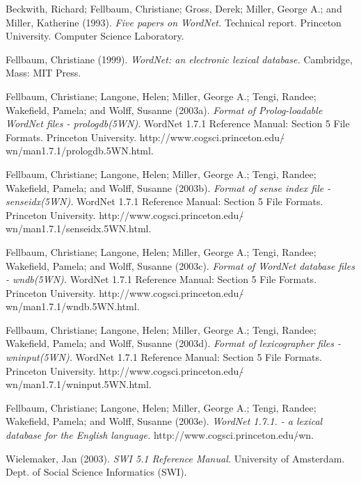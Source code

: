 \documentclass[12pt]{article}
\begin{document}
\newpage

\begin{thebibliography}{}
\raggedright
\frenchspacing

\item[Beckwith, Richard; Fellbaum, Christiane; Gross, Derek; Miller, George A.;
and Miller, Katherine]
(1993).
\emph{Five papers on WordNet.}
Technical report. Princeton University. Computer Science Laboratory.

\item[Fellbaum, Christiane (1999).]
\emph{WordNet: an electronic lexical database.}
Cambridge, Mass: MIT Press.

\item[Fellbaum, Christiane; Langone, Helen; Miller, George A.; Tengi, Randee; Wakefield, Pamela;]
and Wolff, Susanne (2003a).
\emph{Format of Prolog-loadable WordNet files - prologdb(5WN).}
WordNet 1.7.1 Reference Manual: Section 5 File Formats. Princeton University.
http://www.cogsci.princeton.edu/\( \tilde{} \)wn/man1.7.1/prologdb.5WN.html.

\item[Fellbaum, Christiane; Langone, Helen; Miller, George A.; Tengi, Randee; Wakefield, Pamela;]
and Wolff, Susanne (2003b).
\emph{Format of sense index file - senseidx(5WN).}
WordNet 1.7.1 Reference Manual: Section 5 File Formats. Princeton University.
http://www.cogsci.princeton.edu/\( \tilde{} \)wn/man1.7.1/senseidx.5WN.html.

\item[Fellbaum, Christiane; Langone, Helen; Miller, George A.; Tengi, Randee; Wakefield, Pamela;]
and Wolff, Susanne (2003c).
\emph{Format of WordNet database files - wndb(5WN).}
WordNet 1.7.1 Reference Manual: Section 5 File Formats. Princeton University.
http://www.cogsci.princeton.edu/\( \tilde{} \)wn/man1.7.1/wndb.5WN.html.

\item[Fellbaum, Christiane; Langone, Helen; Miller, George A.; Tengi, Randee; Wakefield, Pamela;]
and Wolff, Susanne (2003d).
\emph{Format of lexicographer files - wninput(5WN).}
WordNet 1.7.1 Reference Manual: Section 5 File Formats. Princeton University.
http://www.cogsci.princeton.edu/\( \tilde{} \)wn/man1.7.1/wninput.5WN.html.

\item[Fellbaum, Christiane; Langone, Helen; Miller, George A.; Tengi, Randee; Wakefield, Pamela;]
and Wolff, Susanne (2003e).
\emph{WordNet 1.7.1. - a lexical database for the English language.}
http://www.cogsci.princeton.edu/\( \tilde{} \)wn.

\item[Wielemaker, Jan (2003).]
\emph{SWI 5.1 Reference Manual.}
University of Amsterdam. Dept. of Social Science Informatics (SWI).

\end{thebibliography}
\end{document}
